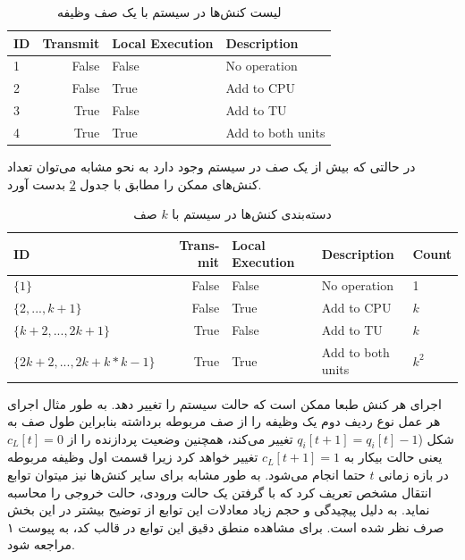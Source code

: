 \begin{table}[H]
	\centering
	\begin{latin}
		\begin{tabular}{@{}lrll@{}}
			\toprule
			\textbf{ID} & \textbf{Transmit} & \textbf{Local Execution} & \textbf{Description} \\ \midrule
			1           & False             & False                    & No operation         \\
			2           & False             & True                     & Add to CPU           \\
			3           & True              & False                    & Add to TU            \\
			4           & True              & True                     & Add to both units    \\ \bottomrule
		\end{tabular}
	\end{latin}
	\caption{لیست کنش‌ها در سیستم با یک صف وظیفه}
	\label{table:actions}
\end{table}
در حالتی که بیش از یک صف در سیستم وجود دارد به نحو مشابه می‌توان تعداد کنش‌های ممکن را مطابق با جدول \ref{table:actions-multiqueue} بدست آورد.
\begin{table}[H]
	\begin{latin}
		\begin{tabular}{@{}lrlll@{}}
			\toprule
			\textbf{ID}                     & \textbf{Transmit} & \textbf{Local Execution} & \textbf{Description} & \textbf{Count}                \\ \midrule
			$\{1\}$                           & False             & False                    & No operation         & 1                    \\
			$\{2, ..., k + 1\}$               & False             & True                     & Add to CPU           & $k$                    \\
			$\{k + 2, ..., 2k + 1\}$          & True              & False                    & Add to TU            & $k$                    \\
			$\{2k + 2, ..., 2k + k * k - 1\}$ & True              & True                     & Add to both units    & $k^2$ \\ \bottomrule
		\end{tabular}
	\end{latin}
	\caption{دسته‌بندی کنش‌ها در سیستم با $k$ صف}
	\label{table:actions-multiqueue}
\end{table}
اجرای هر کنش طبعا ممکن است که حالت سیستم را تغییر دهد. به طور مثال اجرای هر عمل نوع ردیف دوم یک وظیفه را از صف مربوطه برداشته بنابراین طول صف به شکل (\(q_i[t + 1] = q_i[t] - 1\) تغییر می‌کند، همچنین وضعیت پردازنده را از \(c_L[t] = 0\) یعنی حالت بیکار به \(c_L[t + 1] = 1\) تغییر خواهد کرد زیرا قسمت اول وظیفه مربوطه در بازه زمانی \(t\) حتما انجام می‌شود. به طور مشابه برای سایر کنش‌ها نیز میتوان توابع انتقال مشخص تعریف کرد که با گرفتن یک حالت ورودی، حالت خروجی را محاسبه نماید. به دلیل پیچیدگی و حجم زیاد معادلات این توابع از توضیح بیشتر در این بخش صرف نظر شده است. برای مشاهده منطق دقیق این توابع در قالب کد، به پیوست ۱ مراجعه شود.

